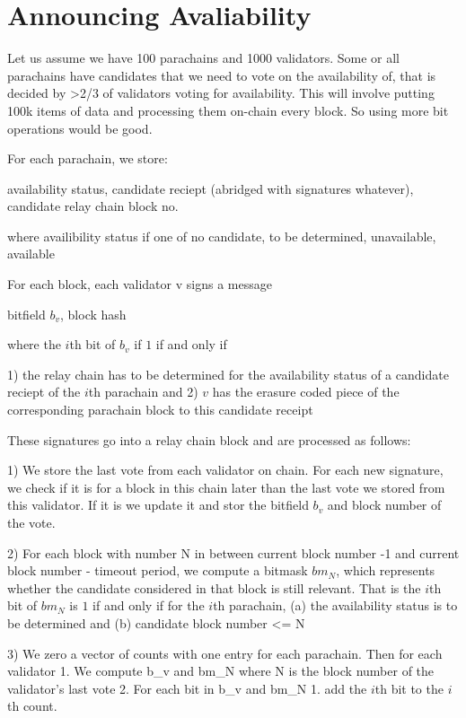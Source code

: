 \section{Announcing Avaliability}\label{voting}

Let us assume we have 100 parachains and 1000 validators. Some or all parachains have candidates that we need to vote on the availability of, that is decided by >2/3 of validators voting for availability. This will involve putting 100k items of data and processing them on-chain every block. So using more bit operations would be good.

For each parachain, we store:

availability status, candidate reciept (abridged with signatures whatever), candidate relay chain block no.

where availibility status if one of {no candidate, to be determined, unavailable, available}

For each block, each validator v signs a message

bitfield $b_v$, block hash

where the $i$th bit of $b_v$ if $1$ if and only if 

1) the relay chain has to be determined for the availability status of a candidate reciept of the $i$th parachain and 
2) $v$ has the erasure coded piece of the corresponding parachain block to this candidate receipt

These signatures go into a relay chain block and are processed as follows:

1) We store the last vote from each validator on chain. For each new signature, we check if it is for a block in this chain later than the last vote we stored from this validator. If it is we update it and stor the bitfield $b_v$ and block number of the vote.

2) For each block with number N in between current block number -1 and current block number - timeout period, we compute a bitmask $bm_N$, which represents whether the candidate considered in that block is still relevant. That is the $i$th bit of $bm_N$ is $1$ if and only if for the $i$th parachain, 
    (a) the availability status is to be determined and
    (b) candidate block number <= N
    
3) We zero a vector of counts with one entry for each parachain. Then for each validator
    1. We compute 
    b_v and bm_N 
    where N is the block number of the validator's last vote
    2. For each bit in b_v and bm_N
        1. add the $i$th bit to the $i$th count.
        
